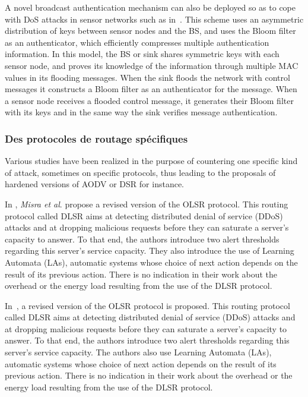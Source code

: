 A novel broadcast authentication mechanism can also be deployed so as to cope with DoS attacks in sensor networks such as in~\cite{SLS10}.
This scheme uses an asymmetric distribution of keys between sensor nodes and the BS, and uses the Bloom filter as an authenticator, which efficiently compresses multiple authentication information.
In this model, the BS or sink shares symmetric keys with each sensor node, and proves its knowledge of the information through multiple MAC values in its flooding messages.
When the sink floods the network with control messages it constructs a Bloom filter as an authenticator for the message.
When a sensor node receives a flooded control message, it generates their Bloom filter with its keys and in the same way the sink verifies message authentication.


    \subsubsection{Des protocoles de routage spécifiques}

Various studies have been realized in the purpose of countering one specific kind of attack, sometimes on specific protocols, thus leading to the proposals of hardened versions of AODV\cite{DLA02} or DSR\cite{CT04} for instance.


In
\cite{MKASF10},
\textit{Misra et al}. propose a revised version of the OLSR protocol.
This routing protocol called DLSR aims at detecting distributed denial of service (DDoS) attacks and at dropping malicious requests before they can saturate a server's capacity to answer.
To that end, the authors introduce two alert thresholds regarding this server's service capacity.
They also introduce the use of Learning Automata (LAs), automatic systems whose choice of next action depends on the result of its previous action.
There is no indication in their work about the overhead or the energy load resulting from the use of the DLSR protocol.

In~\cite{MKASF10}, a revised version of the OLSR protocol is proposed.
This routing protocol called DLSR aims at detecting distributed denial of service (DDoS) attacks and at dropping malicious requests before they can saturate a server's capacity to answer.
To that end, the authors introduce two alert thresholds regarding this server's service capacity.
The authors also use Learning Automata (LAs), automatic systems whose choice of next action depends on the result of its previous action.
There is no indication in their work about the overhead or the energy load resulting from the use of the DLSR protocol.


